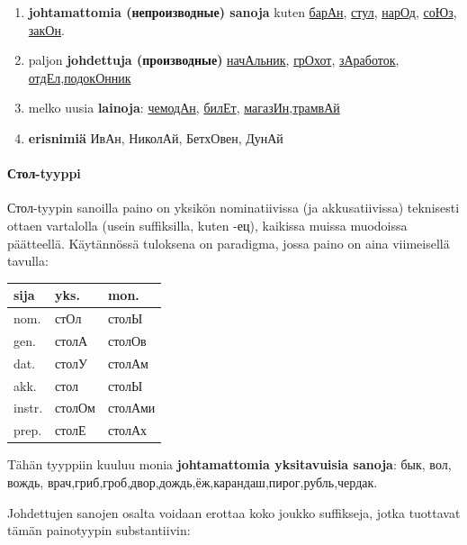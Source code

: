 \documentclass[]{scrartcl}
\providecommand{\tightlist}{%
  \setlength{\itemsep}{0pt}\setlength{\parskip}{0pt}}
\begin{document}
\begin{enumerate}
\def\labelenumi{\arabic{enumi}.}
\tightlist
\item
  \textbf{johtamattomia (непроизводные) sanoja} kuten
  \href{http://ru.wiktionary.org/wiki/баран}{барАн},
  \href{http://ru.wiktionary.org/wiki/стул}{стул},
  \href{http://ru.wiktionary.org/wiki/народ}{нарОд},
  \href{http://ru.wiktionary.org/wiki/союз}{соЮз},
  \href{http://ru.wiktionary.org/wiki/закон}{закОн}.
\item
  paljon \textbf{johdettuja (производные)}
  \href{http://ru.wiktionary.org/wiki/начальник}{начАльник},
  \href{http://ru.wiktionary.org/wiki/грохот}{грОхот},
  \href{http://ru.wiktionary.org/wiki/заработок}{зАработок},
  \href{http://ru.wiktionary.org/wiki/отдел}{отдЕл},\href{http://ru.wiktionary.org/wiki/подоконник}{подокОнник}
\item
  melko uusia \textbf{lainoja}:
  \href{http://ru.wiktionary.org/wiki/чемодан}{чемодАн},
  \href{http://ru.wiktionary.org/wiki/билет}{билЕт},
  \href{http://ru.wiktionary.org/wiki/магазин}{магазИн},\href{http://ru.wiktionary.org/wiki/трамвай}{трамвАй}
\item
  \textbf{erisnimiä} ИвАн, НиколАй, БетхОвен, ДунАй
\end{enumerate}

\paragraph{Стол-tyyppi}\label{ux441ux442ux43eux43b-tyyppi}

Стол-tyypin sanoilla paino on yksikön nominatiivissa (ja akkusatiivissa)
teknisesti ottaen vartalolla (usein suffiksilla, kuten -ец), kaikissa
muissa muodoissa päätteellä. Käytännössä tuloksena on paradigma, jossa
paino on aina viimeisellä tavulla:

\begin{longtable}[c]{@{}lll@{}}
\toprule
sija & yks. & mon.\tabularnewline
\midrule
\endhead
nom. & стОл & столЫ\tabularnewline
gen. & столА & столОв\tabularnewline
dat. & столУ & столАм\tabularnewline
akk. & стол & столЫ\tabularnewline
instr. & столОм & столАми\tabularnewline
prep. & столЕ & столАх\tabularnewline
\bottomrule
\end{longtable}

Tähän tyyppiin kuuluu monia \textbf{johtamattomia yksitavuisia sanoja}:
бык, вол, вождь,
врач,гриб,гроб,двор,дождь,ёж,карандаш,пирог,рубль,чердак.

Johdettujen sanojen osalta voidaan erottaa koko joukko suffikseja, jotka
tuottavat tämän painotyypin substantiivin:
\end{document}
